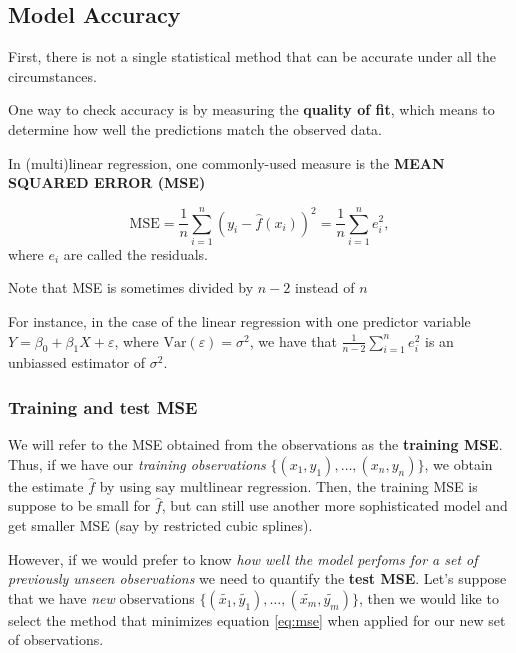 \documentclass[11pt]{article}
\begin{document}
    \hypertarget{model-accuracy}{%
\subsection{Model Accuracy}\label{model-accuracy}}

First, there is not a single statistical method that can be accurate
under all the circumstances.

One way to check accuracy is by measuring the \textbf{quality of fit},
which means to determine how well the predictions match the observed
data.

In (multi)linear regression, one commonly-used measure is the
\textbf{MEAN SQUARED ERROR (MSE)}

\begin{equation}
\mathrm{MSE}= \frac{1}{n}\sum_{i=1}^n (y_i -\hat{f}(x_i))^2 = \frac{1}{n} \sum_{i=1}^n e_i^2,
\label{eq:mse}
\end{equation} where \(e_i\) are called the residuals.


 \begin{tcolorbox}[breakable, size=fbox, boxrule=1pt, pad at break*=1mm,colback=cellbackground, colframe=cellborder]
Note that MSE is sometimes divided by \(n-2\) instead of \(n\)
\end{tcolorbox}

For instance, in the case of the linear regression with one predictor
variable \(Y=\beta_0+ \beta_1 X + \varepsilon\), where
\(\mathrm{Var}(\varepsilon)=\sigma^2\), we have that
\(\frac{1}{n-2} \sum_{i=1}^n e_i^2\) is an unbiassed estimator of
\(\sigma^2\).

\hypertarget{training-and-test-mse}{%
\subsubsection{Training and test MSE}\label{training-and-test-mse}}

We will refer to the MSE obtained from the observations as the
\textbf{training MSE}. Thus, if we have our \emph{training observations}
\(\{ (x_1,y_1),\ldots,(x_n,y_n) \}\), we obtain the estimate \(\hat{f}\)
by using say multlinear regression. Then, the training MSE is suppose to
be small for \(\hat{f}\), but can still use another more sophisticated
model and get smaller MSE (say by restricted cubic splines).

However, if we would prefer to know \emph{how well the model perfoms for
a set of previously unseen observations} we need to quantify the
\textbf{test MSE}. Let's suppose that we have \emph{new} observations
\(\{ (\tilde{x_1},\tilde{y_1}),\ldots,(\tilde{x_m},\tilde{y_m})\}\),
then we would like to select the method that minimizes equation
\ref{eq:mse} when applied for our new set of observations.
\end{document}
